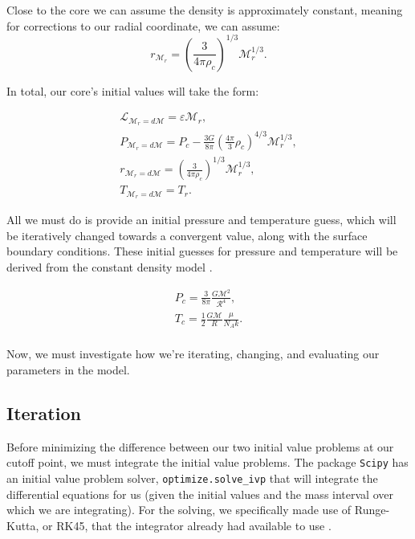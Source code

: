 \documentclass[twocolumn]{aastex631}
\begin{document}
\noindent Close to the core we can assume the density is approximately constant, meaning for corrections to our radial coordinate, we can assume:
\begin{equation}
	r_{\mathcal{M}_r} = \left(\frac{3}{4\pi \rho_c}\right)^{1/3}\mathcal{M}_r^{1/3}.
\end{equation}

\noindent In total, our core's initial values will take the form:

\begin{equation}
\boxed{
\begin{array}{lcl}
\mathcal{L}_{\mathcal{M}_r=d\mathcal{M}} = \varepsilon \mathcal{M}_r,\\
P_{\mathcal{M}_r=d\mathcal{M}} = P_c - \frac{3G}{8\pi}\left(\frac{4\pi}{3}\rho_c\right)^{4/3}\mathcal{M}_r^{1/3},\\
r_{\mathcal{M}_r=d\mathcal{M}} = \left(\frac{3}{4\pi \rho_c}\right)^{1/3}\mathcal{M}_r^{1/3},\\
T_{\mathcal{M}_r=d\mathcal{M}} = T_r.
\end{array}
}
\end{equation}

All we must do is provide an initial pressure and temperature guess, which will be iteratively changed towards a convergent value, along with the surface boundary conditions. These initial guesses for pressure and temperature will be derived from the constant density model \citep{stelint}.

\begin{equation}
\boxed{
\begin{array}{lcl}
P_c = \frac{3}{8\pi}\frac{G\mathcal{M}^2}{\mathcal{R}^4},\\
T_c = \frac{1}{2}\frac{G\mathcal{M}}{R}\frac{\mu}{N_Ak}.\\
\end{array}
}
\end{equation}

\noindent Now, we must investigate how we're iterating, changing, and evaluating our parameters in the model.

\subsection{Iteration}

Before minimizing the difference between our two initial value problems at our cutoff point, we must integrate the initial value problems. The package \texttt{Scipy} has an initial value problem solver, \texttt{optimize.solve\_ivp} that will integrate the differential equations for us (given the initial values and the mass interval over which we are integrating). For the solving, we specifically made use of Runge-Kutta, or RK45, that the integrator already had available to use \citep{scipy}. 
\end{document}
